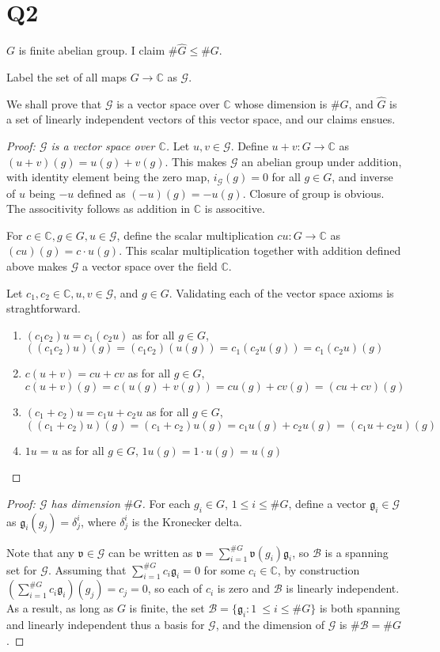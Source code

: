 \documentclass{article}
\theoremstyle{definition}
\theoremstyle{definition}
\theoremstyle{remark}
\newcommand{\bb}[1]{\mathbb{#1}} %
\renewcommand{\hat}[1]{\widehat{#1}}
\newcommand{\G}{\mathcal{G}}
\newcommand{\g}{\mathfrak{g}}
\newcommand{\hG}{\hat{G}}
\begin{document}
\section{Q2}

$G$ is finite abelian group. I claim $\#\hat{G} \leq \#G $.

Label the set of all maps $G \rightarrow \bb{C}$ as $\G$. 

We shall prove that $\G$ is a vector space over $\bb{C}$ whose dimension is $\#G$, and $\hG$ is a set of linearly independent vectors of this vector space, and our claims ensues.

\begin{proof}[Proof: $\G$ is a vector space over $\bb{C}$]

	Let $u, v \in \G$. 
	Define $ u + v: G \rightarrow \bb{C}$ as $(u + v)(g) = u(g) + v(g)$.
	This makes $\G$ an abelian group under addition, with identity element being the zero map, $i_{\G} (g) = 0$ for all $g \in G$, and inverse of $u$ being $-u$ defined as $(-u)(g) = -u(g)$.
	Closure of group is obvious. 
	The associtivity follows as addition in $\bb{C}$ is associtive.

	For $c \in \bb{C}, g\in G, u \in \G$, define the scalar multiplication $cu: G \rightarrow \bb{C}$ as $(cu)(g) = c \cdot u(g)$. 
	This scalar multiplication together with addition defined above makes $\G$ a vector space over the field $\bb{C}$.
	
	Let $c_1, c_2 \in \bb{C}, u, v \in \G$, and $g \in G$.
	Validating each of the vector space axioms is straghtforward. 

	\begin{enumerate}
		\item $(c_1c_2)u = c_1(c_2u)$ as for all $g \in G$, $((c_1c_2)u)(g) = (c_1c_2)(u(g)) = c_1(c_2u(g)) = c_1(c_2u)(g)$
		\item $c(u + v) = cu + cv$ as for all $g \in G$, $c(u + v)(g) = c(u(g) + v(g)) = cu(g) + cv(g) = (cu + cv)(g)$
		\item $(c_1 + c_2)u = c_1u + c_2u$ as for all $g \in G$, $((c_1 + c_2)u)(g) = (c_1 + c_2)u(g) = c_1u(g) + c_2u(g) = (c_1u + c_2u)(g)$
		\item $1u = u$ as for all $g \in G$, $1u(g) = 1 \cdot u(g) = u(g)$
	\end{enumerate}
\end{proof} 

\begin{proof}[Proof: $\G$ has dimension $\#G$]
	For each $g_i \in G$, $1 \leq i \leq \#G$, define a vector $\g_i \in \G$ as $\g_i(g_j) = \delta^i_j$, where $\delta^i_j$ is the Kronecker delta. 
 
	Note that any $\mathfrak{v} \in \G$ can be written as $\mathfrak{v} = \sum_{i=1}^{\#G} \mathfrak{v}(g_i) \g_i$, so $\mathcal{B}$ is a spanning set for $\G$.
	Assuming that $\sum_{i=1}^{\#G} c_i\g_i = 0$ for some $c_i \in \bb{C}$, by construction $(\sum_{i=1}^{\#G} c_i\g_i) (g_j) = c_j = 0$, so each of $c_i$ is zero and $\mathcal{B}$ is linearly independent.
	As a result, as long as $G$ is finite, the set $\mathcal{B} = \{\g_i: 1\ \leq i \leq \#G\}$ is both spanning and linearly independent thus a basis for $\G$, and the dimension of $\G$ is $\#\mathcal{B} = \#G$.
\end{proof}
\end{document}
